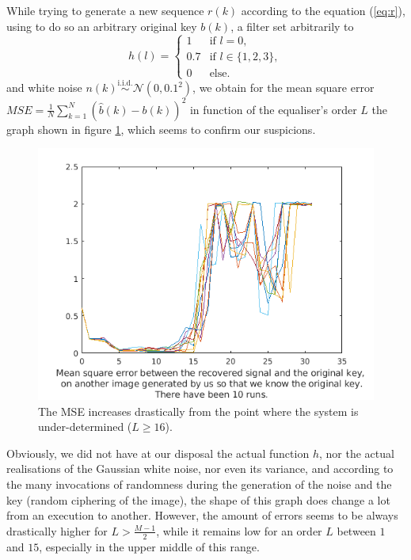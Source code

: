 \documentclass[twocolumn, 12pt]{IEEEtran}
\begin{document}
While trying to generate a new sequence $r(k)$ according to the equation (\ref{eq:r}), using to do so an arbitrary original key $b(k)$, a filter set arbitrarily to 
$$
h(l) =
\left\{
	\begin{array}{ll}
		1  & \mbox{if } l = 0, \\
		0.7 & \mbox{if } l \in \{1, 2, 3\}, \\
		0 & \mbox{else.}
	\end{array}
\right.
$$
and white noise $n(k) \stackrel{\text{i.i.d.}}{\sim } \mathcal{N}(0, 0.1^2)$, we obtain for the mean square error ${MSE = \frac{1}{N}\sum\limits_{k=1}^{N}(\hat{b}(k)-b(k))^2}$ in function of the equaliser's order $L$ the graph shown in figure \ref{fig:g}, which seems to confirm our suspicions.
\begin{figure}[h]
   \begin{center}
      \includegraphics[width=.8\linewidth]{tse4.png}
   \end{center}
\vspace{-0.6cm}
\caption{The MSE increases drastically from the point where the system is under-determined ($L\geq 16$).}
\label{fig:g}
\end{figure}
Obviously, we did not have at our disposal the actual function $h$, nor the actual realisations of the Gaussian white noise, nor even its variance, and according to the many invocations of randomness during the generation of the noise and the key (random ciphering of the image), the shape of this graph does change a lot from an execution to another. However, the amount of errors seems to be always drastically higher for $L > \frac{M-1}{2}$, while it remains low for an order $L$ between $1$ and $15$, especially in the upper middle of this range.
\end{document}
